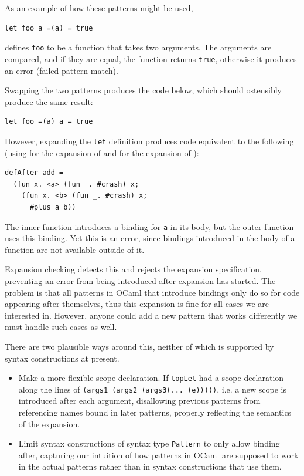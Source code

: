 \documentclass{kththesis}
\begin{document}
As an example of how these patterns might be used,

\begin{verbatim}
let foo a =(a) = true
\end{verbatim}

defines \texttt{foo} to be a function that takes two arguments. The arguments are compared, and if they are equal, the function returns \texttt{true}, otherwise it produces an error (failed pattern match).

Swapping the two patterns produces the code below, which should ostensibly produce the same result:

\begin{verbatim}
let foo =(a) a = true
\end{verbatim}

However, expanding the \texttt{let} definition produces code equivalent to the following (using  for the expansion of  and  for the expansion of ):

\begin{verbatim}
defAfter add =
  (fun x. <a> (fun _. #crash) x;
    (fun x. <b> (fun _. #crash) x;
      #plus a b))
\end{verbatim}

The inner function introduces a binding for \texttt{a} in its body, but the outer function uses this binding. Yet this is an error, since bindings introduced in the body of a function are not available outside of it.

Expansion checking detects this and rejects the expansion specification, preventing an error from being introduced after expansion has started. The problem is that all patterns in OCaml that introduce bindings only do so for code appearing after themselves, thus this expansion is fine for all cases we are interested in. However, anyone could add a new pattern that works differently we must handle such cases as well.

There are two plausible ways around this, neither of which is supported by syntax constructions at present.
\begin{itemize}
  \item Make a more flexible scope declaration. If \texttt{topLet} had a scope declaration along the lines of \texttt{(args1 (args2 (args3(... (e)))))}, i.e. a new scope is introduced after each argument, disallowing previous patterns from referencing names bound in later patterns, properly reflecting the semantics of the expansion.

  \item Limit syntax constructions of syntax type \texttt{Pattern} to only allow binding after, capturing our intuition of how patterns in OCaml are supposed to work in the actual patterns rather than in syntax constructions that use them.
\end{itemize}
\end{document}

